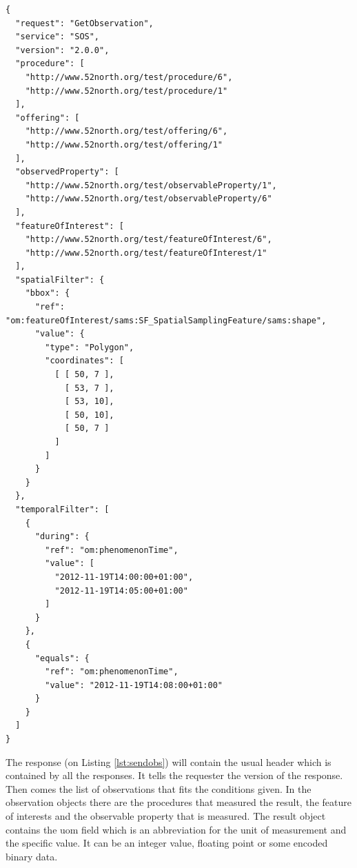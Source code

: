 \begin{lstlisting}[caption={JSON GetObservation POST request with all filters\label{lst:getobs}}]
{
  "request": "GetObservation",
  "service": "SOS",
  "version": "2.0.0",
  "procedure": [
    "http://www.52north.org/test/procedure/6",
    "http://www.52north.org/test/procedure/1"
  ],
  "offering": [
    "http://www.52north.org/test/offering/6",
    "http://www.52north.org/test/offering/1"
  ],
  "observedProperty": [
    "http://www.52north.org/test/observableProperty/1",
    "http://www.52north.org/test/observableProperty/6"
  ],
  "featureOfInterest": [
    "http://www.52north.org/test/featureOfInterest/6",
    "http://www.52north.org/test/featureOfInterest/1"
  ],
  "spatialFilter": {
    "bbox": {
      "ref": "om:featureOfInterest/sams:SF_SpatialSamplingFeature/sams:shape",
      "value": {
        "type": "Polygon",
        "coordinates": [
          [ [ 50, 7 ],
            [ 53, 7 ],
            [ 53, 10],
            [ 50, 10],
            [ 50, 7 ]
          ]
        ]
      }
    }
  },
  "temporalFilter": [
    {
      "during": {
        "ref": "om:phenomenonTime",
        "value": [
          "2012-11-19T14:00:00+01:00",
          "2012-11-19T14:05:00+01:00"
        ]
      }
    },
    { 
      "equals": {
        "ref": "om:phenomenonTime",
        "value": "2012-11-19T14:08:00+01:00"
      }
    }
  ]
}
\end{lstlisting}

The response (on Listing \ref{lst:sendobs}) will contain the usual header which is contained by all the responses. It tells the requester the version of the response. Then comes the list of observations that fits the conditions given. In the observation objects there are the procedures that measured the result, the feature of interests and the observable property that is measured. The result object contains the uom field which is an abbreviation for the unit of measurement and the specific value. It can be an integer value, floating point or some encoded binary data.

